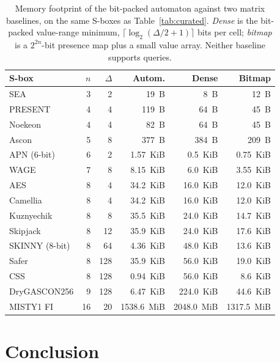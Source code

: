 \documentclass[runningheads]{llncs}
\begin{document}
\begin{table}[h]
\centering
\caption{Memory footprint of the bit-packed automaton against two matrix
baselines, on the same S-boxes as Table~\ref{tab:curated}. \emph{Dense} is the
bit-packed value-range minimum, $\lceil\log_2(\Delta/2+1)\rceil$ bits per cell;
\emph{bitmap} is a $2^{2n}$-bit presence map plus a small value array.
Neither baseline supports queries.}
\label{tab:memory}
\small
\setlength{\tabcolsep}{6pt}
\begin{tabular}{l r r r r r}
\toprule
S-box & $n$ & $\Delta$ & Autom. & Dense & Bitmap\\
\midrule
SEA            &  3 & 2   &        19~B  &              8~B  &     12~B \\
PRESENT        &  4 & 4   &       119~B  &             64~B  &     45~B \\
Noekeon        &  4 & 4   &        82~B  &             64~B  &     45~B \\
Ascon          &  5 & 8   &       377~B  &            384~B  &    209~B \\
APN (6-bit)    &  6 & 2   &    1.57~KiB  &          0.5~KiB  &  0.75~KiB \\
WAGE           &  7 & 8   &    8.15~KiB  &          6.0~KiB  &  3.55~KiB \\
AES            &  8 & 4   &    34.2~KiB  &         16.0~KiB  & 12.0~KiB \\
Camellia       &  8 & 4   &    34.2~KiB  &         16.0~KiB  & 12.0~KiB \\
Kuznyechik     &  8 & 8   &    35.5~KiB  &         24.0~KiB  & 14.7~KiB \\
Skipjack       &  8 & 12  &    35.9~KiB  &         24.0~KiB  & 17.6~KiB \\
SKINNY (8-bit) &  8 & 64  &    4.36~KiB  &         48.0~KiB  & 13.6~KiB \\
Safer          &  8 & 128 &    35.9~KiB  &         56.0~KiB  & 19.0~KiB \\
CSS            &  8 & 128 &    0.94~KiB  &         56.0~KiB  &  8.6~KiB \\
DryGASCON256   &  9 & 128 &    6.47~KiB  &         224.0~KiB & 44.6~KiB \\
MISTY1 FI      & 16 &  20 &  1538.6~MiB  &  2048.0~MiB & 1317.5~MiB \\
\bottomrule
\end{tabular}
\end{table}

\section{Conclusion}
\label{sec:conclusion}
\end{document}
